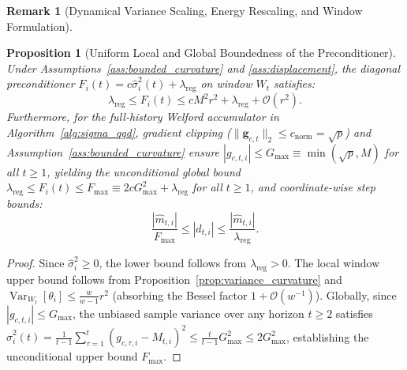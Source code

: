 \documentclass[11pt,a4paper]{article}
\newtheorem{proposition}{Proposition}
\newtheorem{remark}{Remark}
\begin{document}
\begin{remark}[Dynamical Variance Scaling, Energy Rescaling, and Window Formulation]
\begin{itemize}
\end{itemize}
\end{remark}

\begin{proposition}[Uniform Local and Global Boundedness of the Preconditioner]
\label{prop:boundedness}
Under Assumptions~\ref{ass:bounded_curvature} and \ref{ass:displacement}, the diagonal preconditioner $F_i(t) = c \hat{\sigma}_i^2(t) + \lambda_{\text{reg}}$ on window $W_t$ satisfies:
\begin{equation}
\lambda_{\text{reg}} \le F_i(t) \le c M^2 r^2 + \lambda_{\text{reg}} + \mathcal{O}(r^2).
\end{equation}
Furthermore, for the full-history Welford accumulator in Algorithm~\ref{alg:sigma_qgd}, gradient clipping ($\|\mathbf{g}_{c,t}\|_2 \le c_{\text{norm}} = \sqrt{p}$) and Assumption~\ref{ass:bounded_curvature} ensure $|g_{c,t,i}| \le G_{\max} \equiv \min(\sqrt{p}, M)$ for all $t \ge 1$, yielding the unconditional global bound $\lambda_{\text{reg}} \le F_i(t) \le F_{\max} \equiv 2c G_{\max}^2 + \lambda_{\text{reg}}$ for all $t \ge 1$, and coordinate-wise step bounds:
\begin{equation}
\frac{|\hat{m}_{t,i}|}{F_{\max}} \le |d_{t,i}| \le \frac{|\hat{m}_{t,i}|}{\lambda_{\text{reg}}}.
\end{equation}
\end{proposition}

\begin{proof}
Since $\hat{\sigma}_i^2 \ge 0$, the lower bound follows from $\lambda_{\text{reg}} > 0$. The local window upper bound follows from Proposition~\ref{prop:variance_curvature} and $\operatorname{Var}_{W_t}[\theta_i] \le \frac{w}{w-1} r^2$ (absorbing the Bessel factor $1 + \mathcal{O}(w^{-1})$). Globally, since $|g_{c,t,i}| \le G_{\max}$, the unbiased sample variance over any horizon $t \ge 2$ satisfies $\hat{\sigma}_i^2(t) = \frac{1}{t-1}\sum_{\tau=1}^t (g_{c,\tau,i} - M_{t,i})^2 \le \frac{t}{t-1} G_{\max}^2 \le 2 G_{\max}^2$, establishing the unconditional upper bound $F_{\max}$.
\end{proof}
\end{document}
